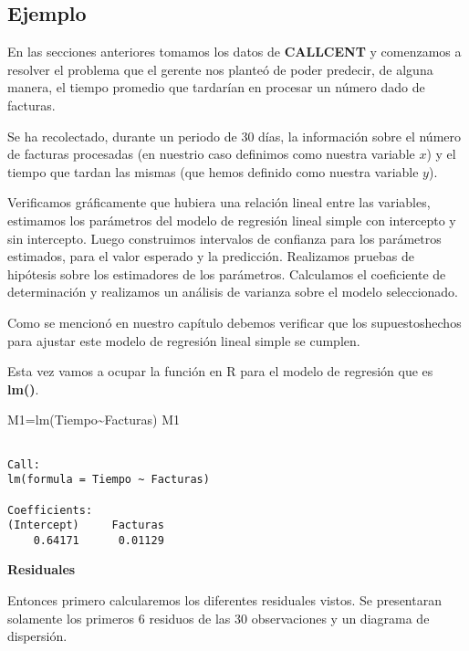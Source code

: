 \documentclass[
  a4paper,
  oneside,
  openany]{book}
\newenvironment{Shaded}{\begin{snugshade}}{\end{snugshade}}
\newcommand{\FunctionTok}[1]{\textcolor[rgb]{0.00,0.00,0.00}{#1}}
\newcommand{\NormalTok}[1]{#1}
\newcommand{\OtherTok}[1]{\textcolor[rgb]{0.56,0.35,0.01}{#1}}
\newcommand{\SpecialCharTok}[1]{\textcolor[rgb]{0.00,0.00,0.00}{#1}}
\begin{document}
\hypertarget{ejemplo-19}{%
\subsection{Ejemplo}\label{ejemplo-19}}

En las secciones anteriores tomamos los datos de \textbf{CALLCENT} y comenzamos a resolver el problema que el gerente nos planteó de poder
predecir, de alguna manera, el tiempo promedio que tardarían en procesar un número dado de facturas.

Se ha recolectado, durante un periodo de 30 días, la información sobre el número de facturas procesadas (en nuestrio caso definimos como nuestra variable \(x\)) y el tiempo que tardan las mismas (que hemos definido como nuestra variable \(y\)).

Verificamos gráficamente que hubiera una relación lineal entre las variables, estimamos los parámetros del modelo de regresión lineal simple con intercepto y sin intercepto. Luego construimos intervalos de confianza para los parámetros estimados, para el valor esperado y la predicción. Realizamos pruebas de hipótesis sobre los estimadores de los parámetros. Calculamos el coeficiente de determinación y realizamos un análisis de varianza sobre el modelo seleccionado.

Como se mencionó en nuestro capítulo debemos verificar que los supuestoshechos para ajustar este modelo de regresión lineal simple se cumplen.

Esta vez vamos a ocupar la función en R para el modelo de regresión que es \textbf{lm()}.

\begin{Shaded}
\begin{Highlighting}[]
\NormalTok{M1}\OtherTok{=}\FunctionTok{lm}\NormalTok{(Tiempo}\SpecialCharTok{\textasciitilde{}}\NormalTok{Facturas)}
\NormalTok{M1}
\end{Highlighting}
\end{Shaded}

\begin{verbatim}

Call:
lm(formula = Tiempo ~ Facturas)

Coefficients:
(Intercept)     Facturas  
    0.64171      0.01129  
\end{verbatim}

\textbf{Residuales}

Entonces primero calcularemos los diferentes residuales vistos. Se presentaran solamente los primeros 6 residuos de las 30 observaciones y un diagrama de dispersión.
\end{document}
